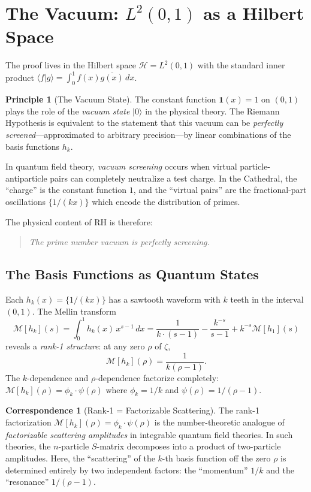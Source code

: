 \documentclass[11pt,a4paper]{article}
\theoremstyle{definition}
\newtheorem{principle}[definition]{Principle}
\newtheorem{correspondence}[definition]{Correspondence}
\newcommand{\HH}{\mathcal{H}}
\newcommand{\fract}[1]{\{#1\}}
\newcommand{\ket}[1]{| #1 \rangle}
\newcommand{\braket}[2]{\langle #1 | #2 \rangle}
\begin{document}
\section{The Vacuum: $L^2(0,1)$ as a Hilbert Space}

The proof lives in the Hilbert space $\HH = L^2(0,1)$ with the standard
inner product $\braket{f}{g} = \int_0^1 f(x)\overline{g(x)}\,dx$.

\begin{principle}[The Vacuum State]
The constant function $\mathbf{1}(x) = 1$ on $(0,1)$ plays the role of
the \emph{vacuum state} $\ket{0}$ in the physical theory. The Riemann
Hypothesis is equivalent to the statement that this vacuum can be
\emph{perfectly screened}---approximated to arbitrary precision---by
linear combinations of the basis functions $h_k$.
\end{principle}

In quantum field theory, \emph{vacuum screening} occurs when virtual
particle-antiparticle pairs can completely neutralize a test charge.
In the Cathedral, the ``charge'' is the constant function $1$, and the
``virtual pairs'' are the fractional-part oscillations $\fract{1/(kx)}$
which encode the distribution of primes.

The physical content of RH is therefore:
\begin{quote}
\emph{The prime number vacuum is perfectly screening.}
\end{quote}

\subsection{The Basis Functions as Quantum States}

Each $h_k(x) = \fract{1/(kx)}$ has a sawtooth waveform with $k$ teeth
in the interval $(0,1)$. The Mellin transform
\[
  \mathcal{M}[h_k](s) = \int_0^1 h_k(x) \, x^{s-1}\,dx = \frac{1}{k \cdot (s-1)}
  - \frac{k^{-s}}{s-1} + k^{-s}\mathcal{M}[h_1](s)
\]
reveals a \emph{rank-1 structure}: at any zero $\rho$ of $\zeta$,
\[
  \mathcal{M}[h_k](\rho) = \frac{1}{k(\rho - 1)}.
\]
The $k$-dependence and $\rho$-dependence factorize completely:
$\mathcal{M}[h_k](\rho) = \phi_k \cdot \psi(\rho)$ where
$\phi_k = 1/k$ and $\psi(\rho) = 1/(\rho-1)$.

\begin{correspondence}[Rank-1 = Factorizable Scattering]
The rank-1 factorization $\mathcal{M}[h_k](\rho) = \phi_k \cdot \psi(\rho)$
is the number-theoretic analogue of \emph{factorizable scattering amplitudes}
in integrable quantum field theories. In such theories, the $n$-particle
$S$-matrix decomposes into a product of two-particle amplitudes. Here,
the ``scattering'' of the $k$-th basis function off the zero $\rho$ is
determined entirely by two independent factors: the ``momentum'' $1/k$
and the ``resonance'' $1/(\rho-1)$.
\end{correspondence}
\end{document}
